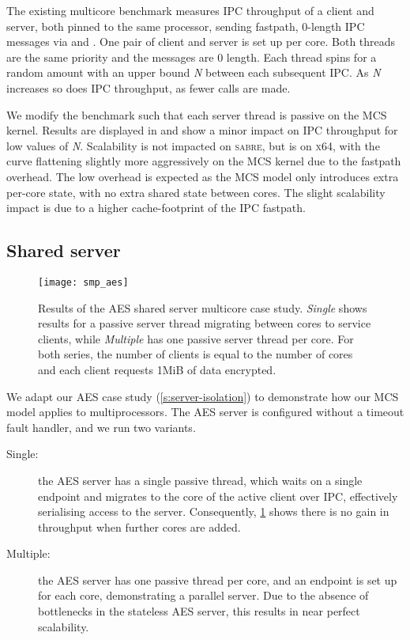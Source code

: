 The existing multicore benchmark measures IPC throughput of a client and server, both 
pinned to the same processor, sending fastpath, 0-length IPC messages via \call
and \replyrecv. One pair of client and server is set up per core. Both threads are
the same priority and the messages are 0 length. Each thread spins for a random amount
with an upper bound \textit{N} between each subsequent IPC. As \textit{N} increases so does
IPC throughput, as fewer calls are made.

We modify the benchmark such that each server thread is passive on the MCS kernel.
Results are displayed in  and show a minor impact on IPC throughput
for low values of \textit{N}. Scalability is not impacted on \textsc{sabre}, but is on \textsc{x64},
with the curve flattening slightly more aggressively on the MCS kernel
due to the fastpath overhead. The low overhead is expected as the MCS model only introduces extra 
per-core state, with no extra shared state between cores. The slight scalability impact is
due to a higher cache-footprint of the IPC fastpath. 
\clearpage
\subsection{Shared server}

\begin{figure}[t] 
    \centering
    \texttt{[image: smp\_aes]}
    \caption[Results of the AES shared server multicore case study.]{Results of the AES shared server multicore case study. \emph{Single} shows results for a 
        passive server thread migrating between cores to service clients, while \emph{Multiple} has one
        passive server thread per core. For both series, the number of clients is equal to the number of
        cores and each client requests 1MiB of data encrypted. }
    \label{f:evaluation-smp-aes}
\end{figure}

We adapt our \gls{AES} case study (\cref{s:server-isolation}) to demonstrate how our MCS model 
applies to multiprocessors. The AES server is configured without a timeout fault handler, and
we run two variants. 

\begin{description}
    \item[Single:] the AES server has a single passive thread, which waits on a single endpoint
        and migrates to the core of the active client over IPC, effectively serialising access to the server.
        Consequently, \cref{f:evaluation-smp-aes} shows there is no gain in throughput when further cores are
        added. 
    \item[Multiple:] the AES server has one passive thread per core, and an endpoint is set up for
        each core, demonstrating a parallel server. Due to the absence of bottlenecks in the stateless 
        AES server, this results in near perfect scalability.
\end{description}

